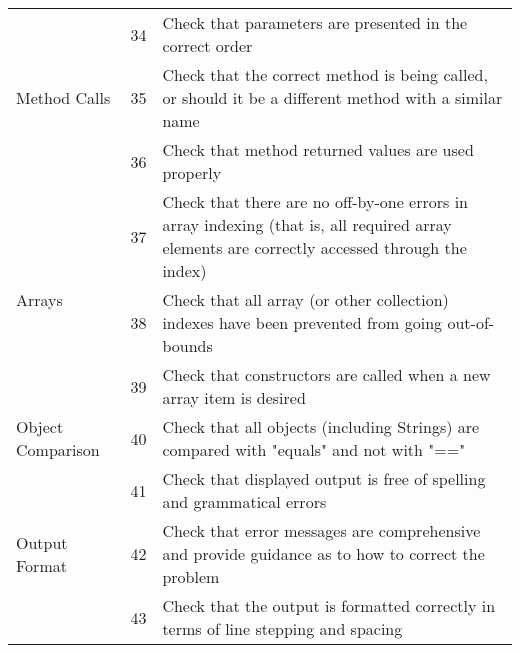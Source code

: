 \documentclass[11pt, a4paper,titlepage]{article}
\begin{document}
									\begin{tabularx}{\textwidth}{| X | l | X |}
										\hline
										
	\multirow{3}{*}{Method Calls}		& \label{itm:34} 34 &  
										Check that parameters are presented in the correct order
										\\	\cline{2-3}
										& \label{itm:35} 35 &  
										Check that the correct method is being called, or should it be a different
										method with a similar name
										\\	\cline{2-3}
										& \label{itm:36} 36 & 
										Check that method returned values are used properly 
										\\   \hline
	\multirow{3}{*}{Arrays}				& \label{itm:37} 37 &  
										Check that there are no off-by-one errors in array indexing (that is, all
										required array elements are correctly accessed through the index)
										\\	\cline{2-3}
										& \label{itm:38} 38 &  
										Check that all array (or other collection) indexes have been prevented
										from going out-of-bounds
										\\	\cline{2-3}
										& \label{itm:39} 39 &  
										Check that constructors are called when a new array item is desired
										\\   \hline
	\multirow{1}{*}{Object Comparison} 	& \label{itm:40} 40 &  
										Check that all objects (including Strings) are compared with "equals" and
										not with "=="
										\\	\hline
	\multirow{3}{*}{Output Format}		& \label{itm:41} 41 &  
										Check that displayed output is free of spelling and grammatical errors
										\\	\cline{2-3}
										& \label{itm:42} 42 &  
										Check that error messages are comprehensive and provide guidance as to
										how to correct the problem
										\\	\cline{2-3}
										& \label{itm:43} 43 &  
										Check that the output is formatted correctly in terms of line stepping and
										spacing
										\\   \hline	
									\end{tabularx}
\end{document}
